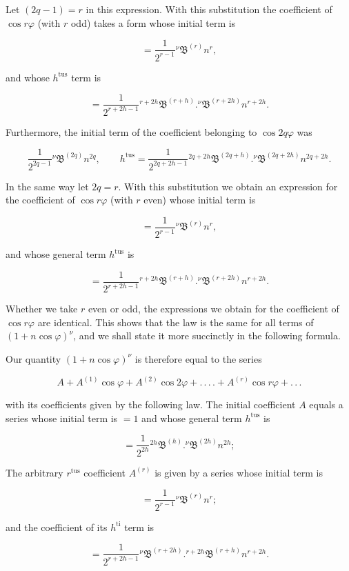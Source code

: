 \par\noindent{}%
Let $(2q-1) = r$ in this expression. With this substitution the coefficient of $\cos r\varphi$ (with $r$ odd) takes a form whose initial term is

\[
= \frac{1}{2^{r-1}} {}^{\nu}\mathfrak{B}^{(r)} n^{r},
\]

\noindent and whose $h^{\text{tus}}$ term is

\[
= \frac{1}{2^{r+2h-1}} {}^{r+2h}\mathfrak{B}^{(r+h)}  .  {}^{\nu}\mathfrak{B}^{(r+2h)} n^{r+2h}.
\]

\noindent Furthermore, the initial term of the coefficient belonging to $\cos 2q\varphi$ was

\[
\frac{1}{2^{2q-1}} {}^{\nu}\mathfrak{B}^{(2q)} n^{2q}, \qquad h^{\text{tus}} = \frac{1}{2^{2q+2h-1}} {}^{2q+2h}\mathfrak{B}^{(2q+h)}  .  {}^{\nu}\mathfrak{B}^{(2q+2h)} n^{2q+2h}.
\]

\noindent In the same way let $2q = r$. With this substitution we obtain an expression for the coefficient of $\cos r\varphi$ (with $r$ even) whose initial term is

\[
= \frac{1}{2^{r-1}} {}^{\nu}\mathfrak{B}^{(r)} n^{r},
\]

\noindent and whose general term $h^{\text{tus}}$ is

\[
= \frac{1}{2^{r+2h-1}} {}^{r+2h}\mathfrak{B}^{(r+h)}  .  {}^{\nu}\mathfrak{B}^{(r+2h)} n^{r+2h}.
\]

\noindent Whether we take $r$ even or odd, the expressions we obtain for the coefficient of $\cos r\varphi$ are identical. This shows that the law is the same for all terms of $(1+n\cos\varphi)^{\nu}$, and we shall state it more succinctly in the following formula.

Our quantity $(1+n\cos\varphi)^{\nu}$ is therefore equal to the series

\[
A + A^{(1)}\cos\varphi + A^{(2)}\cos 2\varphi + .\,.\,.\,. + A^{(r)}\cos r\varphi + .\,.\,.
\]

\noindent with its coefficients given by the following law. The initial coefficient $A$ equals a series whose initial term is $=1$ and whose general term $h^{\text{tus}}$ is

\[
= \frac{1}{2^{2h}} {}^{2h}\mathfrak{B}^{(h)}  .  {}^{\nu}\mathfrak{B}^{(2h)} n^{2h};
\]

\noindent The arbitrary $r^{\text{tus}}$ coefficient $A^{(r)}$ is given by a series whose initial term is

\[
= \frac{1}{2^{r-1}} {}^{\nu}\mathfrak{B}^{(r)} n^{r};
\]

\noindent and the coefficient of its $h^{\text{ti}}$ term is

\[
= \frac{1}{2^{r+2h-1}} {}^{\nu}\mathfrak{B}^{(r+2h)}  .  {}^{r+2h}\mathfrak{B}^{(r+h)} n^{r+2h}.
\]
